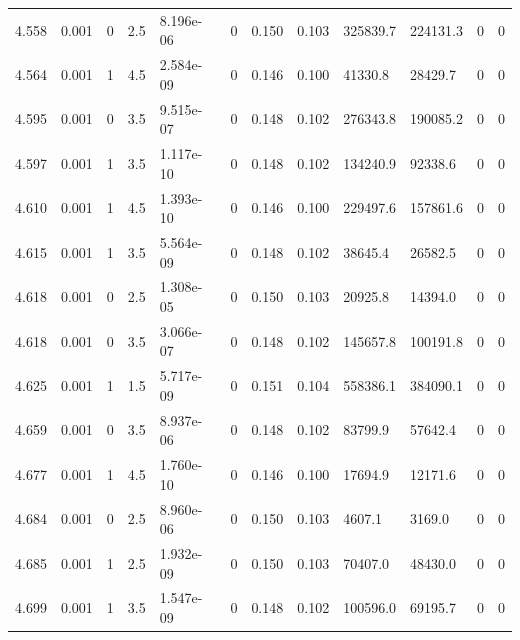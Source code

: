 \documentclass[preview]{standalone}
\begin{document}
{{{{{{{{{{\begin{tabular}{L{1.2cm}C{1.2cm} C{0.3cm}C{0.5cm} C{1.4cm}C{1.4cm} C{1.4cm}C{1.4cm} C{1.6cm}C{1.6cm} C{1.6cm}C{1.6cm}}
  4.558  &  0.001  & 0     & 2.5 &  8.196e-06  & 0  &  0.150&   0.103& 325839.7 & 224131.3   &  0 & 0  \\ 
  4.564  &  0.001  & 1     & 4.5 &  2.584e-09  & 0  &  0.146&   0.100& 41330.8 & 28429.7   &  0 & 0  \\ 
  4.595  &  0.001  & 0     & 3.5 &  9.515e-07  & 0  &  0.148&   0.102& 276343.8 & 190085.2   &  0 & 0  \\ 
  4.597  &  0.001  & 1     & 3.5 &  1.117e-10  & 0  &  0.148&   0.102& 134240.9 & 92338.6   &  0 & 0  \\ 
  4.610  &  0.001  & 1     & 4.5 &  1.393e-10  & 0  &  0.146&   0.100& 229497.6 & 157861.6   &  0 & 0  \\ 
  4.615  &  0.001  & 1     & 3.5 &  5.564e-09  & 0  &  0.148&   0.102& 38645.4 & 26582.5   &  0 & 0  \\ 
  4.618  &  0.001  & 0     & 2.5 &  1.308e-05  & 0  &  0.150&   0.103& 20925.8 & 14394.0   &  0 & 0  \\ 
  4.618  &  0.001  & 0     & 3.5 &  3.066e-07  & 0  &  0.148&   0.102& 145657.8 & 100191.8   &  0 & 0  \\ 
  4.625  &  0.001  & 1     & 1.5 &  5.717e-09  & 0  &  0.151&   0.104& 558386.1 & 384090.1   &  0 & 0  \\ 
  4.659  &  0.001  & 0     & 3.5 &  8.937e-06  & 0  &  0.148&   0.102& 83799.9 & 57642.4   &  0 & 0  \\ 
  4.677  &  0.001  & 1     & 4.5 &  1.760e-10  & 0  &  0.146&   0.100& 17694.9 & 12171.6   &  0 & 0  \\ 
  4.684  &  0.001  & 0     & 2.5 &  8.960e-06  & 0  &  0.150&   0.103& 4607.1 & 3169.0   &  0 & 0  \\ 
  4.685  &  0.001  & 1     & 2.5 &  1.932e-09  & 0  &  0.150&   0.103& 70407.0 & 48430.0   &  0 & 0  \\ 
  4.699  &  0.001  & 1     & 3.5 &  1.547e-09  & 0  &  0.148&   0.102& 100596.0 & 69195.7   &  0 & 0  \\ 
\hline 
\end{tabular} 

}}}}}}}}}}
\end{document}
